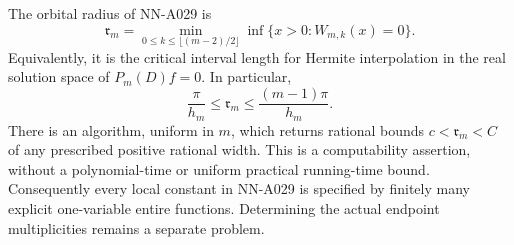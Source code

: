 \begin{theorem}
\label{thm:analytic-orbital-wronskians}
The orbital radius of NN-A029 is
\begin{equation}\label{eq:analytic-wronskian-radius}
 \boxed{\displaystyle
 \mathfrak r_m=
 \min_{0\le k\le\lfloor(m-2)/2\rfloor}
        \inf\{x>0:W_{m,k}(x)=0\}.}
\end{equation}
Equivalently, it is the critical interval length for Hermite
interpolation in the real solution space of $P_m(D)f=0$.
In particular,
\begin{equation}\label{eq:analytic-radius-elementary-bounds}
       \frac\pi{h_m}\le\mathfrak r_m
                         \le\frac{(m-1)\pi}{h_m}.
\end{equation}
There is an algorithm, uniform in $m$, which returns rational bounds
$c<\mathfrak r_m<C$ of any prescribed positive rational width.
This is a computability assertion, without a polynomial-time or
uniform practical running-time bound. Consequently every local
constant in NN-A029 is specified by finitely many explicit
one-variable entire functions. Determining the actual endpoint
multiplicities remains a separate problem.
\end{theorem}

